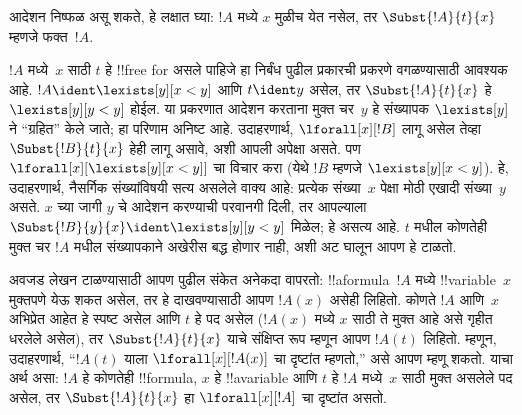 \documentclass[../../../include/open-logic-section]{subfiles}
\begin{document}
\begin{explain}
आदेशन निष्फळ असू शकते, हे लक्षात घ्या: $!A$ मध्ये $x$ मुळीच येत नसेल,
तर $\Subst{!A}{t}{x}$ म्हणजे फक्त~$!A$.

$!A$ मध्ये~$x$ साठी $t$ हे !!{free for} असले पाहिजे हा निर्बंध पुढील
प्रकारची प्रकरणे वगळण्यासाठी आवश्यक आहे. $!A \ident
\lexists[y][x < y]$ आणि $t \ident y$ असेल, तर
$\Subst{!A}{t}{x}$ हे $\lexists[y][y < y]$ होईल. या प्रकरणात आदेशन
करताना मुक्त चर~$y$ हे संख्यापक $\lexists[y]$ ने ``ग्रहित'' केले जाते;
हा परिणाम अनिष्ट आहे. उदाहरणार्थ, $\lforall[x][!B]$ लागू असेल तेव्हा
$\Subst{!B}{t}{x}$ हेही लागू असावे, अशी आपली अपेक्षा असते. पण
$\lforall[x][\lexists[y][x < y]]$ चा विचार करा (येथे $!B$ म्हणजे
$\lexists[y][x < y]$). हे, उदाहरणार्थ, नैसर्गिक संख्यांविषयी सत्य
असलेले वाक्य आहे: प्रत्येक संख्या~$x$ पेक्षा मोठी एखादी संख्या~$y$
असते. $x$ च्या जागी $y$ चे आदेशन करण्याची परवानगी दिली, तर आपल्याला
$\Subst{!B}{y}{x} \ident \lexists[y][y < y]$ मिळेल; हे असत्य आहे.
$t$ मधील कोणतेही मुक्त चर $!A$ मधील संख्यापकाने अखेरीस बद्ध होणार नाही,
अशी अट घालून आपण हे टाळतो.
\end{explain}

अवजड लेखन टाळण्यासाठी आपण पुढील संकेत अनेकदा वापरतो: !!a{formula}~$!A$
मध्ये !!{variable}~$x$ मुक्तपणे येऊ शकत असेल, तर हे दाखवण्यासाठी आपण
$!A(x)$ असेही लिहितो. कोणते $!A$ आणि~$x$ अभिप्रेत आहेत हे स्पष्ट असेल
आणि $t$ हे पद असेल ($!A(x)$ मध्ये $x$ साठी ते मुक्त आहे असे गृहीत
धरलेले असेल), तर $\Subst{!A}{t}{x}$ याचे संक्षिप्त रूप म्हणून आपण
$!A(t)$ लिहितो. म्हणून, उदाहरणार्थ, ``$!A(t)$ याला
$\lforall[x][!A(x)]$ चा दृष्टांत म्हणतो,'' असे आपण म्हणू शकतो. याचा
अर्थ असा: $!A$ हे कोणतेही !!{formula}, $x$ हे !!a{variable} आणि $t$ हे
$!A$ मध्ये~$x$ साठी मुक्त असलेले पद असेल, तर
$\Subst{!A}{t}{x}$ हा $\lforall[x][!A]$ चा दृष्टांत असतो.
\end{document}
